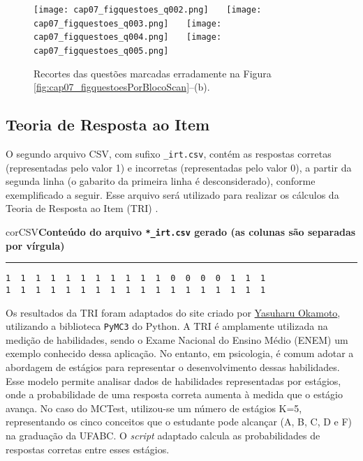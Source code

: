 \begin{figure}[!ht]
\centering
\texttt{[image: cap07\_figquestoes\_q002.png]} \ \ \ 
\texttt{[image: cap07\_figquestoes\_q003.png]} \ \ \ 
\texttt{[image: cap07\_figquestoes\_q004.png]} \ \ \ 
\texttt{[image: cap07\_figquestoes\_q005.png]} \ \ \ 
\caption{Recortes das questões marcadas erradamente na Figura \ref{fig:cap07_figquestoesPorBlocoScan}--(b).}
\label{fig:cap07_figquestoesPorBlocoScanErros}
\end{figure}

\subsection{Teoria de Resposta ao Item}

O segundo arquivo CSV, com sufixo \verb|_irt.csv|, contém as respostas corretas (representadas pelo valor 1) e incorretas (representadas pelo valor 0), a partir da segunda linha (o gabarito da primeira linha é desconsiderado), conforme exemplificado a seguir. Esse arquivo será utilizado para realizar os cálculos da Teoria de Resposta ao Item (TRI) \cite{birnbaum1968some}.

\begin{myboxCode}{corCSV}{\textbf{Conteúdo do arquivo \texttt{*\_irt.csv} gerado (as colunas são separadas por vírgula)}}\vspace{3mm}
\hrule
{\footnotesize
\begin{verbatim}
1  1  1  1  1  1  1  1  1  1  1  0  0  0  0  1  1  1
1  1  1  1  1  1  1  1  1  1  1  1  1  1  1  1  1  1
\end{verbatim}
}
\end{myboxCode}

Os resultados da TRI foram adaptados do site criado por \href{http://y-okamoto-psy1949.la.coocan.jp/Python/en1/IRTLClassPyMC3/}{Yasuharu Okamoto}, utilizando a biblioteca \verb|PyMC3| do Python. A TRI é amplamente utilizada na medição de habilidades, sendo o Exame Nacional do Ensino Médio (ENEM) um exemplo conhecido dessa aplicação. No entanto, em psicologia, é comum adotar a abordagem de estágios para representar o desenvolvimento dessas habilidades. Esse modelo permite analisar dados de habilidades representadas por estágios, onde a probabilidade de uma resposta correta aumenta à medida que o estágio avança. No caso do MCTest, utilizou-se um número de estágios K=5, representando os cinco conceitos que o estudante pode alcançar (A, B, C, D e F) na graduação da UFABC. O \textit{script} adaptado calcula as probabilidades de respostas corretas entre esses estágios.


